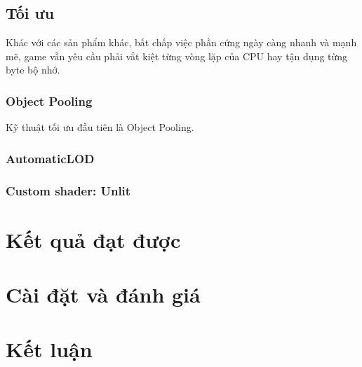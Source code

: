 \documentclass[12pt]{report}
\begin{document}
\section{Tối ưu}
Khác với các sản phẩm khác, bất chấp việc phần cứng ngày càng nhanh và mạnh mẽ, game vẫn yêu cầu phải vắt kiệt từng vòng lặp của CPU hay tận dụng từng byte bộ nhớ. 

\subsection{Object Pooling}
\label{sec:pool}
Kỹ thuật tối ưu đầu tiên là Object Pooling. 

\subsection{AutomaticLOD}
\label{sec:autolod}
\subsection{Custom shader: Unlit}

\chapter{Kết quả đạt được}
\chapter{Cài đặt và đánh giá}

\stopcontents[parts]

\chapter*{Kết luận}
\end{document}
